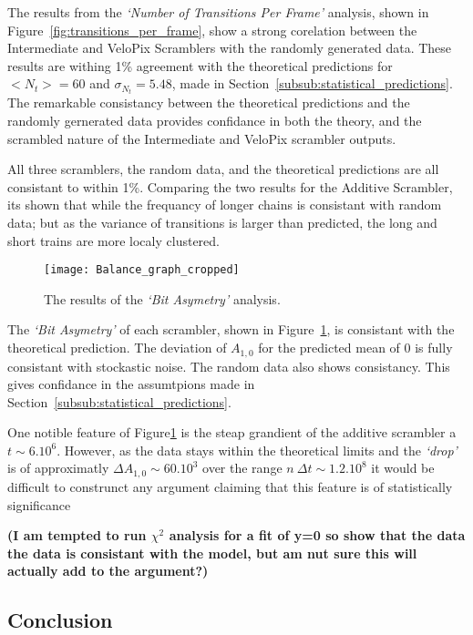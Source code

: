 			The results from the \textit{`Number of Transitions Per Frame'} analysis, shown in Figure~\ref{fig:transitions_per_frame}, show a strong corelation between the Intermediate and VeloPix Scramblers with the randomly generated data. 
			These results are withing 1\% agreement with the theoretical predictions for $<N_t> = 60$ and $\sigma_{N_t} = 5.48$, made in Section~\ref{subsub:statistical_predictions}. 
			The remarkable consistancy between the theoretical predictions and the randomly gernerated data provides confidance in both the theory, and the scrambled nature of the Intermediate and VeloPix scrambler outputs.
			\par		
			 All three scramblers, the random data, and the theoretical predictions are all consistant to within 1\%. 
			 Comparing the two results for the Additive Scrambler, its shown that while the frequancy of longer chains is consistant with random data; but as the variance of transitions is larger than predicted, the long and short trains are more localy clustered. 

			\begin{figure}
				\centering
				\texttt{[image: Balance\_graph\_cropped]}
				\caption{The results of the \textit{`Bit Asymetry'} analysis.}
				\label{fig:bit_asym}
			\end{figure}

			The \textit{`Bit Asymetry'} of each scrambler, shown in Figure~\ref{fig:bit_asym}, is consistant with the theoretical prediction. 
			The deviation of $A_{1,0}$ for the predicted mean of 0 is fully consistant with stockastic noise. 
			The random data also shows consistancy. 
			This gives confidance in the assumtpions made in Section~\ref{subsub:statistical_predictions}.		
 			\par		
 			One notible feature of Figure\ref{fig:bit_asym} is the steap grandient of the additive scrambler a $t \sim 6.10^6$.		
 			However, as the data stays within the theoretical limits and the \textit{`drop'} is of approximatly $\Delta A_{1,0} \sim 60.10^3$ over the range $n\ \Delta t \sim 1.2.10^8$ it would be difficult to construnct any argument claiming that this feature is of statistically significance		
 			\par		
 			\textbf{(I am tempted to run $\chi^2$ analysis for a fit of y=0 so show that the data the data is consistant with the model, but am nut sure this will actually add to the argument?)}

	\subsection{Conclusion}

